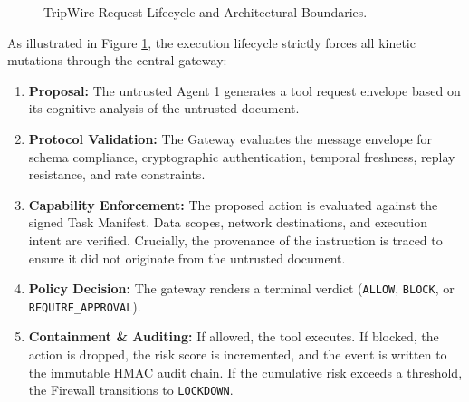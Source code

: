 \documentclass[10pt,a4paper]{article}
\begin{document}
\begin{figure}[htbp]
{
}
\caption{TripWire Request Lifecycle and Architectural Boundaries.}
\label{fig:architecture}
\end{figure}

As illustrated in Figure \ref{fig:architecture}, the execution lifecycle strictly forces all kinetic mutations through the central gateway:
\begin{enumerate}
    \item \textbf{Proposal:} The untrusted Agent 1 generates a tool request envelope based on its cognitive analysis of the untrusted document.
    \item \textbf{Protocol Validation:} The Gateway evaluates the message envelope for schema compliance, cryptographic authentication, temporal freshness, replay resistance, and rate constraints.
    \item \textbf{Capability Enforcement:} The proposed action is evaluated against the signed Task Manifest. Data scopes, network destinations, and execution intent are verified. Crucially, the provenance of the instruction is traced to ensure it did not originate from the untrusted document.
    \item \textbf{Policy Decision:} The gateway renders a terminal verdict (\texttt{ALLOW}, \texttt{BLOCK}, or \texttt{REQUIRE\_APPROVAL}).
    \item \textbf{Containment \& Auditing:} If allowed, the tool executes. If blocked, the action is dropped, the risk score is incremented, and the event is written to the immutable HMAC audit chain. If the cumulative risk exceeds a threshold, the Firewall transitions to \texttt{LOCKDOWN}.
\end{enumerate}
\end{document}
